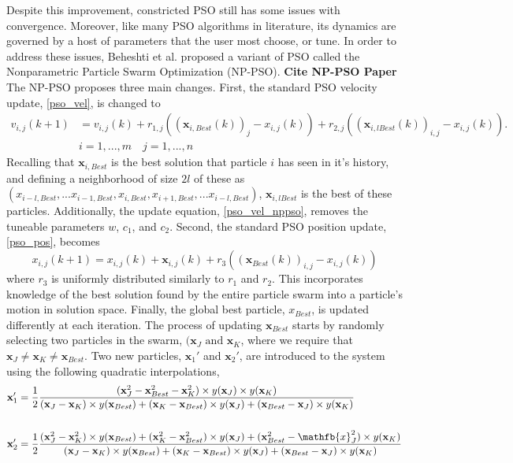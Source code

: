 Despite this improvement, constricted PSO still has some issues with convergence. Moreover, like many PSO algorithms in literature, its dynamics are governed by a host of parameters that the user most choose, or tune. In order to address these issues, Beheshti et al. proposed a variant of PSO called the Nonparametric Particle Swarm Optimization (NP-PSO). \textbf{Cite NP-PSO Paper} The NP-PSO proposes three main changes. First, the standard PSO velocity update, \ref{pso_vel}, is changed to
\begin{equation} \label{pso_vel_nppso}
    \begin{aligned}
    v_{i,j}(k+1) &= v_{i,j}(k) + r_{1,j}((\mathbf{x}_{i,Best}(k))_j - x_{i,j}(k)) + r_{2,j} ((\mathbf{x}_{i,lBest}(k))_{i,j} - x_{i,j}(k)). \\ 
    &i=1,...,m \quad j=1,...,n
    \end{aligned}
\end{equation}
Recalling that $\mathbf{x}_{i,Best}$ is the best solution that particle $i$ has seen in it's history, and defining a neighborhood of size $2l$ of these as $({x}_{i-l,Best},...{x}_{i-1,Best},{x}_{i,Best},{x}_{i+1,Best},...{x}_{i-l,Best})$, $\mathbf{x}_{i,lBest}$ is the best of these particles. Additionally, the update equation, \ref{pso_vel_nppso}, removes the tuneable parameters $w$, $c_1$, and $c_2$. 
Second, the standard PSO position update, \ref{pso_pos}, becomes
\begin{equation} \label{pso_pos_nppso}
    x_{i,j}(k+1) = x_{i,j}(k) + \mathbf{x}_{i,j}(k) + r_3 ((\mathbf{x}_{Best}(k))_{i,j} - x_{i,j}(k))
\end{equation}
where $r_3$ is uniformly distributed similarly to $r_1$ and $r_2$. This incorporates knowledge of the best solution found by the entire particle swarm into a particle's motion in solution space. Finally, the global best particle, $x_{Best}$, is updated differently at each iteration. The process of updating $\mathbf{x}_{Best}$ starts by randomly selecting two particles in the swarm, $(\mathbf{x}_J \textrm{ and } \mathbf{x}_K$, where we require that $\mathbf{x}_J \neq \mathbf{x}_K \neq \mathbf{x}_{Best}$. Two new particles, $\mathbf{x}_1'$ and $\mathbf{x}_2'
$, are introduced to the system using the following quadratic interpolations,
\begin{align} \label{nppso_interpolations}
    \mathbf{x}_1' &= \frac{1}{2} \frac{(\mathbf{x}_J^2 - \mathbf{x}_{Best}^2 - \mathbf{x}_K^2) \times y(\mathbf{x}_J) \times y(\mathbf{x}_K)}{(\mathbf{x}_J - \mathbf{x}_K) \times y(\mathbf{x}_{Best}) + (\mathbf{x}_K - \mathbf{x}_{Best}) \times y(\mathbf{x}_J) + (\mathbf{x}_{Best} - \mathbf{x}_J) \times y(\mathbf{x}_K)} \label{nppso_interp_1}\\ \nonumber\\
    \mathbf{x}_2' &= \frac{1}{2} \frac{(\mathbf{x}_J^2 - \mathbf{x}_K^2) \times y(\mathbf{x}_{Best}) + (\mathbf{x}_K^2 - \mathbf{x}_{Best}^2) \times y(\mathbf{x}_J) + (\mathbf{x}_{Best}^2 - \mathfb{x}_J^2) \times y(\mathbf{x}_K)}{(\mathbf{x}_J - \mathbf{x}_K) \times y(\mathbf{x}_{Best}) + (\mathbf{x}_K - \mathbf{x}_{Best}) \times y(\mathbf{x}_J) + (\mathbf{x}_{Best} - \mathbf{x}_J) \times y(\mathbf{x}_K)}  \label{nppso_interp_2}
\end{align}
